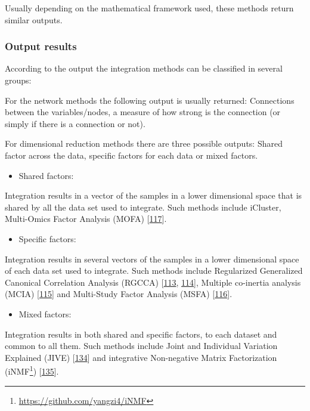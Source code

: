 \documentclass[
  a4paper,
]{book}
\DeclareRobustCommand{\href}[2]{#2\footnote{\url{#1}}}
\providecommand{\tightlist}{%
  \setlength{\itemsep}{0pt}\setlength{\parskip}{0pt}}
\begin{document}
Usually depending on the mathematical framework used, these methods return similar outputs.

\hypertarget{output-results}{%
\subsubsection{Output results}\label{output-results}}

According to the output the integration methods can be classified in several groups:

For the network methods the following output is usually returned: Connections between the variables/nodes, a measure of how strong is the connection (or simply if there is a connection or not).

For dimensional reduction methods there are three possible outputs: Shared factor across the data, specific factors for each data or mixed factors.

\begin{itemize}
\tightlist
\item
  Shared factors:
\end{itemize}

Integration results in a vector of the samples in a lower dimensional space that is shared by all the data set used to integrate.
Such methods include iCluster, Multi-Omics Factor Analysis (MOFA) {[}\protect\hyperlink{ref-argelaguet_multi-omics_2018}{117}{]}.

\begin{itemize}
\tightlist
\item
  Specific factors:
\end{itemize}

Integration results in several vectors of the samples in a lower dimensional space of each data set used to integrate.
Such methods include Regularized Generalized Canonical Correlation Analysis (RGCCA) {[}\protect\hyperlink{ref-tenenhaus_regularized_2011}{113}, \protect\hyperlink{ref-tenenhaus_variable_2014}{114}{]}, Multiple co-inertia analysis (MCIA) {[}\protect\hyperlink{ref-culhane_cross-platform_2003}{115}{]} and Multi-Study Factor Analysis (MSFA) {[}\protect\hyperlink{ref-vito_multi-study_2019}{116}{]}.

\begin{itemize}
\tightlist
\item
  Mixed factors:
\end{itemize}

Integration results in both shared and specific factors, to each dataset and common to all them.
Such methods include Joint and Individual Variation Explained (JIVE) {[}\protect\hyperlink{ref-lock2013a}{134}{]} and integrative Non-negative Matrix Factorization (\href{https://github.com/yangzi4/iNMF}{iNMF}) {[}\protect\hyperlink{ref-yang2016}{135}{]}.
\end{document}
